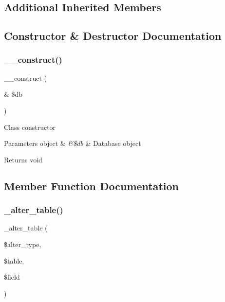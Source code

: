 \subsection*{Additional Inherited Members}


\subsection{Constructor \& Destructor Documentation}
\mbox{\label{class_c_i___d_b__postgre__forge_aaf2ef772755ec6f361d44e16cc9ffd69}} 
\subsubsection{\texorpdfstring{\+\_\+\+\_\+construct()}{\_\_construct()}}
{\footnotesize\ttfamily \+\_\+\+\_\+construct (\begin{DoxyParamCaption}\item[{\&}]{\$db }\end{DoxyParamCaption})}

Class constructor


\begin{DoxyParams}[1]{Parameters}
object & {\em \&\$db} & Database object \\
\hline
\end{DoxyParams}
\begin{DoxyReturn}{Returns}
void 
\end{DoxyReturn}


\subsection{Member Function Documentation}
\mbox{\label{class_c_i___d_b__postgre__forge_a41c6cae02f2fda8b429ad0afb9509426}} 
\subsubsection{\texorpdfstring{\+\_\+alter\+\_\+table()}{\_alter\_table()}}
{\footnotesize\ttfamily \+\_\+alter\+\_\+table (\begin{DoxyParamCaption}\item[{}]{\$alter\+\_\+type,  }\item[{}]{\$table,  }\item[{}]{\$field }\end{DoxyParamCaption})\hspace{0.3cm}{\ttfamily [protected]}}

